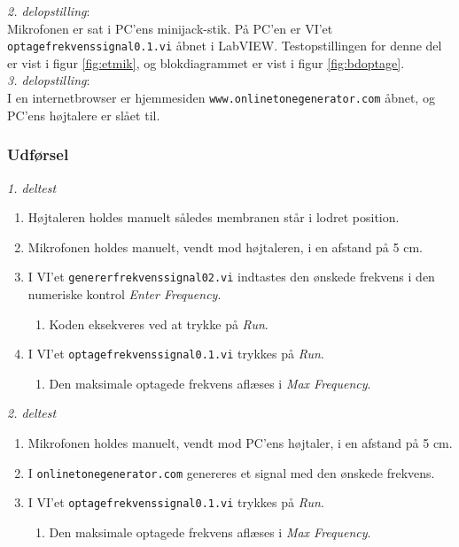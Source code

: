 		\textit{2. delopstilling}:\\
		Mikrofonen er sat i PC'ens minijack-stik. På PC'en er VI'et \texttt{optagefrekvenssignal0.1.vi} åbnet i LabVIEW. Testopstillingen for denne del er vist i figur \ref{fig:etmik}, og blokdiagrammet er vist i figur \ref{fig:bdoptage}.\\  
		
		\textit{3. delopstilling}:\\
		I en internetbrowser er hjemmesiden \texttt{www.onlinetonegenerator.com} åbnet, og PC'ens højtalere er slået til. 
		
		\subsubsection{Udførsel}
			
			\textit{1. deltest}
			\begin{enumerate}
				\item Højtaleren holdes manuelt således membranen står i lodret position. 
				\item Mikrofonen holdes manuelt, vendt mod højtaleren, i en afstand på 5 cm. 
				\item I VI'et \texttt{genererfrekvenssignal02.vi} indtastes den ønskede frekvens i den numeriske kontrol \textit{Enter Frequency}. 
					\begin{enumerate}
						\item Koden eksekveres ved at trykke på \textit{Run}. 
					\end{enumerate} 
				\item I VI'et \texttt{optagefrekvenssignal0.1.vi} trykkes på \textit{Run}. 
					\begin{enumerate}
						\item Den maksimale optagede frekvens aflæses i \textit{Max Frequency}. 
					\end{enumerate}	 	
			\end{enumerate}
			
			
			\textit{2. deltest}			
			\begin{enumerate}
				\item Mikrofonen holdes manuelt, vendt mod PC'ens højtaler, i en afstand på 5 cm. 
				\item I \texttt{onlinetonegenerator.com} genereres et signal med den ønskede frekvens. 
				\item I VI'et \texttt{optagefrekvenssignal0.1.vi} trykkes på \textit{Run}. 
					\begin{enumerate}
						\item Den maksimale optagede frekvens aflæses i \textit{Max Frequency}. 
					\end{enumerate}	  
			\end{enumerate}
		
